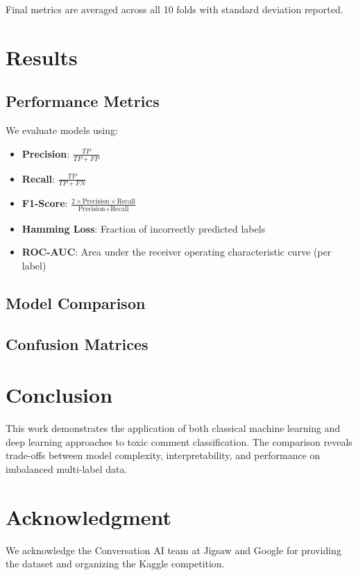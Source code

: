 \documentclass[conference]{IEEEtran}
\begin{document}
Final metrics are averaged across all 10 folds with standard deviation reported.

\section{Results}
\label{sec:results}


\subsection{Performance Metrics}

We evaluate models using:

\begin{itemize}
    \item \textbf{Precision}: $\frac{TP}{TP + FP}$
    \item \textbf{Recall}: $\frac{TP}{TP + FN}$
    \item \textbf{F1-Score}: $\frac{2 \times \text{Precision} \times \text{Recall}}{\text{Precision} + \text{Recall}}$
    \item \textbf{Hamming Loss}: Fraction of incorrectly predicted labels
    \item \textbf{ROC-AUC}: Area under the receiver operating characteristic curve (per label)
\end{itemize}

\subsection{Model Comparison}


\subsection{Confusion Matrices}


\section{Conclusion}
\label{sec:conclusion}

This work demonstrates the application of both classical machine learning and deep learning approaches to toxic comment classification. The comparison reveals trade-offs between model complexity, interpretability, and performance on imbalanced multi-label data.

\section*{Acknowledgment}

We acknowledge the Conversation AI team at Jigsaw and Google for providing the dataset and organizing the Kaggle competition.



\end{document}
